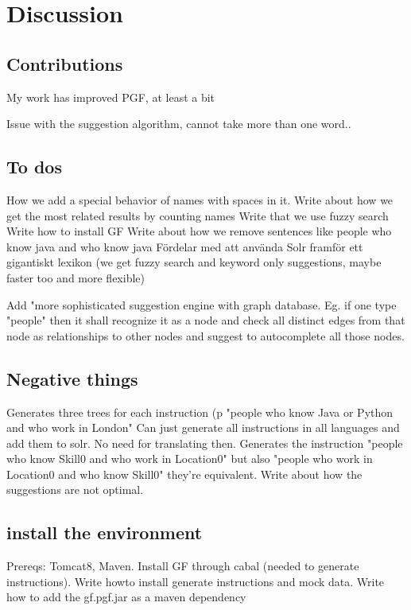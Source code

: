 \chapter{Discussion}\label{ch:discussion}

\section{Contributions}
My work has improved PGF, at least a bit


Issue with the suggestion algorithm, cannot take more than one word..

\section{To dos}
How we add a special behavior of names with spaces in it.
Write about how we get the most related results by counting names
Write that we use fuzzy search
Write how to install GF
Write about how we remove sentences like people who know java and who know java
Fördelar med att använda Solr framför ett gigantiskt lexikon (we get fuzzy search and keyword only suggestions, maybe faster too and more flexible)


Add "more sophisticated suggestion engine with graph database. Eg. if one type "people" then it shall recognize it as a node and check all distinct edges from that node as relationships to other nodes and suggest to autocomplete all those nodes.
\section{Negative things}
Generates three trees for each instruction (p "people who know Java or Python and who work in London"
Can just generate all instructions in all languages and add them to solr. No need for translating then.
Generates the instruction "people who know Skill0 and who work in Location0" but also "people who work in Location0 and who know Skill0" they're equivalent.
Write about how the suggestions are not optimal.

\section{install the environment}
Prereqs: Tomcat8, Maven. Install GF through cabal (needed to generate instructions). Write howto install generate instructions and mock data. Write how to add the gf.pgf.jar as a maven dependency


